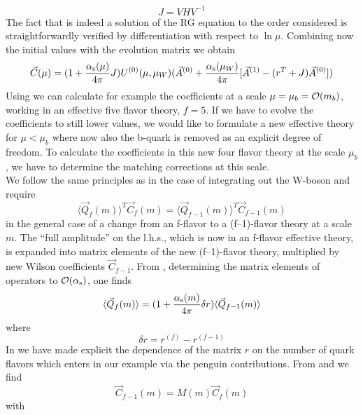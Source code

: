 \begin{equation}\label{jvs} J=V H V^{-1}   \end{equation}
The fact that  is indeed a solution of the RG equation 
to the order considered is straightforwardly verified by differentiation
with respect to $\ln\mu$. Combining now the initial values 
with the evolution matrix  we obtain
\begin{equation}\label{cjua} \vec C(\mu)=(1+{\alpha_{\rm s}(\mu)\over 4\pi} J)U^{(0)}(\mu,\mu_W)
(\vec A^{(0)}+{\alpha_{\rm s}(\mu_W)\over 4\pi}[\vec A^{(1)}-(r^T+J)\vec A^{(0)}])\end{equation}
Using  we can calculate for example the coefficients at a scale
$\mu=\mu_b={\cal O}(m_b)$, working in an effective five flavor theory, $f=5$.
If we have to evolve the coefficients to still lower values, we would
like to formulate a new effective theory for $\mu<\mu_b$ where now
also the b-quark is removed as an explicit degree of freedom. To
calculate the coefficients in this new four flavor theory at the
scale $\mu_b$, we have to determine the matching corrections at
this scale.\\
We follow the same principles as in the case of integrating out the
W-boson and require
\begin{equation}\label{qfcf}
\langle\vec Q_f(m)\rangle^T\vec C_f(m)=
\langle\vec Q_{f-1}(m)\rangle^T\vec C_{f-1}(m)  \end{equation}
in the general case of a change from an f-flavor to a (f--1)-flavor
theory at a scale $m$. The ``full amplitude'' on the l.h.s., which is
now in an f-flavor effective theory, is expanded into matrix elements
of the new (f--1)-flavor theory, multiplied by new Wilson coefficients
$\vec C_{f-1}$. From , determining the matrix elements of
operators to ${\cal O}(\alpha_{\rm s})$, one finds
\begin{equation}\label{qfdr}
\langle\vec Q_f(m)\rangle=(1+{\alpha_{\rm s}(m)\over 4\pi} \delta r)
\langle\vec Q_{f-1}(m)\rangle    \end{equation}
where
\begin{equation}\label{drrf} \delta r=r^{(f)}-r^{(f-1)}
\end{equation}
In  we have made explicit the dependence of the matrix $r$
on the number of quark flavors which enters in our example via the
penguin contributions. From  and  we find
\begin{equation}\label{cmcf}
\vec C_{f-1}(m)=M(m)\vec C_f(m)  \end{equation}
with
